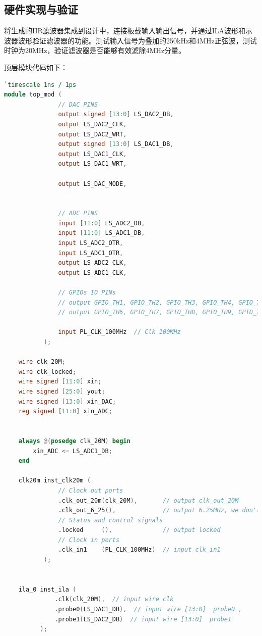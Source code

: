 \subsection{硬件实现与验证}
将生成的IIR滤波器集成到设计中，连接板载输入输出信号，并通过ILA波形和示波器波形验证滤波器的功能。测试输入信号为叠加的250kHz和4MHz正弦波，测试时钟为20MHz，验证滤波器是否能够有效滤除4MHz分量。

顶层模块代码如下：
\begin{lstlisting}[language=verilog,caption={顶层模块代码},label=lst:top_module]
`timescale 1ns / 1ps
module top_mod (
               // DAC PINS
               output signed [13:0] LS_DAC2_DB,
               output LS_DAC2_CLK,
               output LS_DAC2_WRT,
               output signed [13:0] LS_DAC1_DB,
               output LS_DAC1_CLK,
               output LS_DAC1_WRT,
    
               output LS_DAC_MODE,
    
    
               // ADC PINS
               input [11:0] LS_ADC2_DB,
               input [11:0] LS_ADC1_DB,
               input LS_ADC2_OTR,
               input LS_ADC1_OTR,
               output LS_ADC2_CLK,
               output LS_ADC1_CLK,
    
               // GPIOs IO PINs
               // output GPIO_TH1, GPIO_TH2, GPIO_TH3, GPIO_TH4, GPIO_TH5,
               // output GPIO_TH6, GPIO_TH7, GPIO_TH8, GPIO_TH9, GPIO_TH10
    
               input PL_CLK_100MHz  // Clk 100MHz
           );
    
    wire clk_20M;
    wire clk_locked;
    wire signed [11:0] xin;
    wire signed [25:0] yout;
    wire signed [13:0] xin_DAC;
    reg signed [11:0] xin_ADC;
    
    
    always @(posedge clk_20M) begin
        xin_ADC <= LS_ADC1_DB;
    end
    
    clk20m inst_clk20m (
               // Clock out ports
               .clk_out_20m(clk_20M),       // output clk_out_20M
               .clk_out_6_25(),             // output 6.25MHz, we don't use it
               // Status and control signals
               .locked     (),              // output locked
               // Clock in ports
               .clk_in1    (PL_CLK_100MHz)  // input clk_in1
           );
    
    
    ila_0 inst_ila (
              .clk(clk_20M),  // input wire clk
              .probe0(LS_DAC1_DB),  // input wire [13:0]  probe0 ,
              .probe1(LS_DAC2_DB)  // input wire [13:0]  probe1
          );
    

\end{lstlisting}
